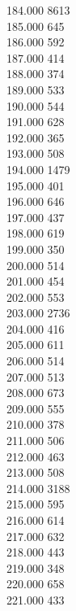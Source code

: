 { 184.000	8613 \\
 185.000	645 \\
 186.000	592 \\
 187.000	414 \\
 188.000	374 \\
 189.000	533 \\
 190.000	544 \\
 191.000	628 \\
 192.000	365 \\
 193.000	508 \\
 194.000	1479 \\
 195.000	401 \\
 196.000	646 \\
 197.000	437 \\
 198.000	619 \\
 199.000	350 \\
 200.000	514 \\
 201.000	454 \\
 202.000	553 \\
 203.000	2736 \\
 204.000	416 \\
 205.000	611 \\
 206.000	514 \\
 207.000	513 \\
 208.000	673 \\
 209.000	555 \\
 210.000	378 \\
 211.000	506 \\
 212.000	463 \\
 213.000	508 \\
 214.000	3188 \\
 215.000	595 \\
 216.000	614 \\
 217.000	632 \\
 218.000	443 \\
 219.000	348 \\
 220.000	658 \\
 221.000	433 \\
}
